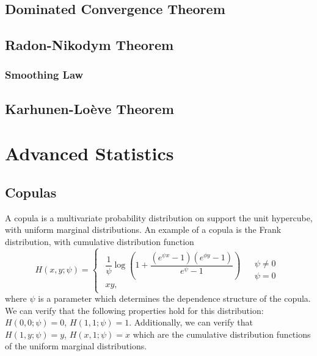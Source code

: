 \documentclass[11pt]{report} %
\begin{document}
\section{Dominated Convergence Theorem}

\section{Radon-Nikodym Theorem}

\subsection{Smoothing Law}

\section{Karhunen-Lo\`eve Theorem}


\chapter{Advanced Statistics}

\section{Copulas}

A copula is a multivariate probability distribution on support the unit hypercube, with uniform marginal distributions. An example of a copula is the Frank distribution, with cumulative distribution function
\begin{equation}
H\left(x, y; \psi\right) = \begin{cases}
\begin{array}{c}
\dfrac{1}{\psi}\log\left(1+\dfrac{\left(e^{\psi x}-1\right)\left(e^{\phi y}-1\right)}{e^{\psi}-1}\right)\\
xy,
\end{array} & \begin{array}{c}
\psi\neq0\\
\psi=0
\end{array}\end{cases}
\end{equation}
where $\psi$ is a parameter which determines the dependence structure of the copula. We can verify that the following properties hold for this distribution: $H\left(0, 0; \psi\right) = 0$, $H\left(1, 1; \psi\right) = 1$. Additionally, we can verify that $H\left(1, y; \psi\right) = y$, $H\left(x, 1; \psi\right) = x$ which are the cumulative distribution functions of the uniform marginal distributions. \\
\end{document}
